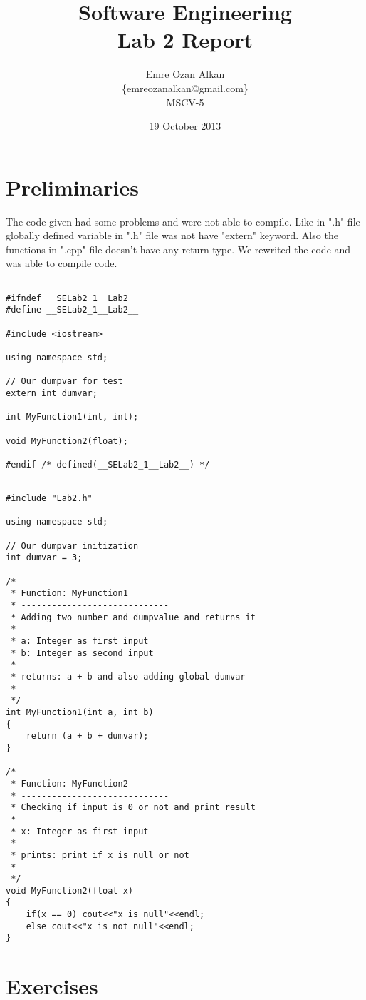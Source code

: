 \documentclass{article}
\title{Software Engineering\\
		Lab 2 Report}
\author{Emre Ozan Alkan\\
		\{emreozanalkan@gmail.com\}\\
		MSCV-5}
\date{19 October 2013}
\begin{document}
\maketitle

\section{Preliminaries}

The code given had some problems and were not able to compile. Like in ".h" file globally defined variable in ".h" file was not have "extern" keyword. Also the functions in ".cpp" file doesn't have any return type.  We rewrited the code and was able to compile code.

\begin{lstlisting}[label=lab21-h,caption=Lab2.h]
	
#ifndef __SELab2_1__Lab2__
#define __SELab2_1__Lab2__

#include <iostream>

using namespace std;

// Our dumpvar for test
extern int dumvar;

int MyFunction1(int, int);

void MyFunction2(float);

#endif /* defined(__SELab2_1__Lab2__) */
\end{lstlisting}

\begin{lstlisting}[label=lab21-cpp,caption=Lab2.cpp]
	
#include "Lab2.h"

using namespace std;

// Our dumpvar initization
int dumvar = 3;

/*
 * Function: MyFunction1
 * -----------------------------
 * Adding two number and dumpvalue and returns it
 *
 * a: Integer as first input
 * b: Integer as second input
 *
 * returns: a + b and also adding global dumvar
 *
 */
int MyFunction1(int a, int b)
{
    return (a + b + dumvar);
}

/*
 * Function: MyFunction2
 * -----------------------------
 * Checking if input is 0 or not and print result
 *
 * x: Integer as first input
 *
 * prints: print if x is null or not
 *
 */
void MyFunction2(float x)
{
    if(x == 0) cout<<"x is null"<<endl;
    else cout<<"x is not null"<<endl;
}
\end{lstlisting}


\section{Exercises}
	
\end{document}
